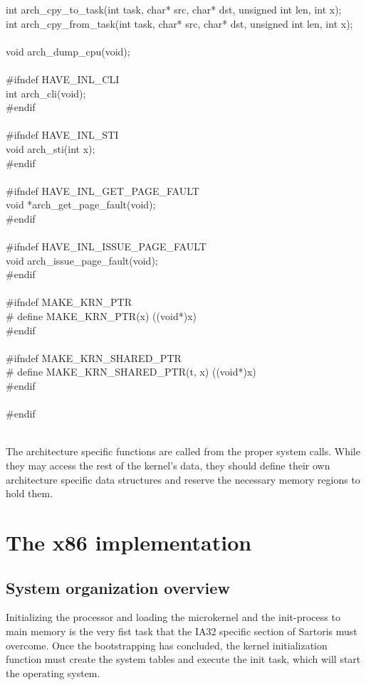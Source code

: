 \documentclass[11pt, letterpaper, twoside, english]{book}
\begin{document}
\begin{sf}
int arch\_cpy\_to\_task(int task, char* src, char* dst, unsigned int len, int x);\\
int arch\_cpy\_from\_task(int task, char* src, char* dst, unsigned int len, int x);\\
\\
void arch\_dump\_cpu(void);\\
\\
\#ifndef HAVE\_INL\_CLI\\
int arch\_cli(void);\\
\#endif\\
\\
\#ifndef HAVE\_INL\_STI\\
void arch\_sti(int x);\\
\#endif\\
\\
\#ifndef HAVE\_INL\_GET\_PAGE\_FAULT\\
void *arch\_get\_page\_fault(void);\\
\#endif\\
\\
\#ifndef HAVE\_INL\_ISSUE\_PAGE\_FAULT\\
void arch\_issue\_page\_fault(void);\\
\#endif\\
\\
\#ifndef MAKE\_KRN\_PTR\\
\# define MAKE\_KRN\_PTR(x) ((void*)x)\\
\#endif\\
\\
\#ifndef MAKE\_KRN\_SHARED\_PTR\\
\# define MAKE\_KRN\_SHARED\_PTR(t, x) ((void*)x)\\
\#endif\\
\\
\#endif\\
\end{sf}
\\
The architecture specific functions are called from the proper system calls. While they may access the rest of the kernel's data, they should define their own architecture specific data structures and reserve the necessary memory regions to hold them. 

\chapter{The x86 implementation}
\section{System organization overview}
Initializing the processor and loading the microkernel and the init-process to main memory is the very fist task that the IA32 specific section of Sartoris must overcome. Once the bootstrapping has concluded, the kernel initialization function must create the system tables and execute the init task, which will start the operating system. 
\end{document}
